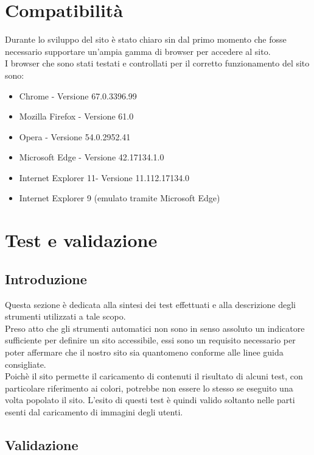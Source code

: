 \documentclass[a4paper,12pt]{article}
\begin{document}
\section{Compatibilità}
Durante lo sviluppo del sito è stato chiaro sin dal primo momento che fosse necessario supportare un'ampia gamma di browser per accedere al sito.
\\I browser che sono stati testati e controllati per il corretto funzionamento del sito sono:
\begin{itemize}
	\item Chrome - Versione 67.0.3396.99 
	\item Mozilla Firefox - Versione 61.0
	\item Opera - Versione 54.0.2952.41
	\item Microsoft Edge - Versione 42.17134.1.0
	\item Internet Explorer 11- Versione 11.112.17134.0
	\item Internet Explorer 9 (emulato tramite Microsoft Edge)
\end{itemize}

\section{Test e validazione}
\subsection{Introduzione}
Questa sezione è dedicata alla sintesi dei test effettuati e alla descrizione degli strumenti utilizzati a tale scopo.\\
Preso atto che gli strumenti automatici non sono in senso assoluto un indicatore sufficiente per definire un sito accessibile, essi sono un requisito necessario per poter affermare che il nostro sito sia quantomeno conforme alle linee guida consigliate.\\
Poichè il sito permette il caricamento di contenuti il risultato di alcuni test, con particolare riferimento ai colori, potrebbe non essere lo stesso se eseguito una volta popolato il sito. L'esito di questi test è quindi valido soltanto nelle parti esenti dal caricamento di immagini degli utenti.
\subsection{Validazione}
\end{document}
